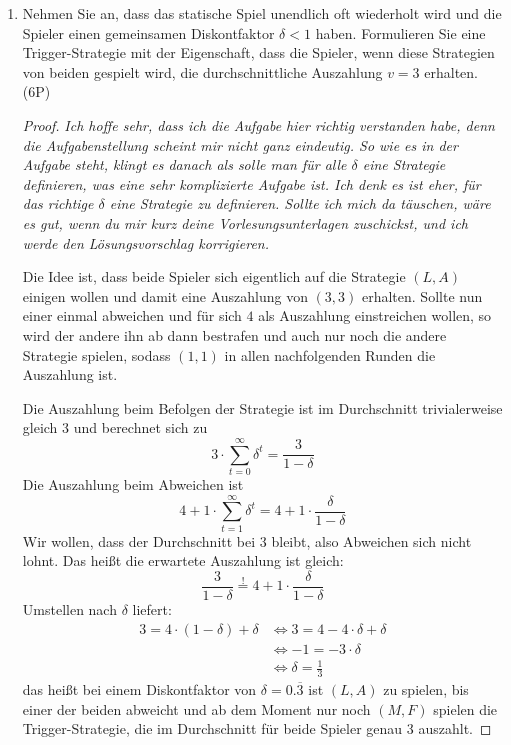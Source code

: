 \documentclass[12pt]{article}
\begin{document}
\begin{enumerate}[label=\alph*\upshape)]
\begin{proof}
			\textit{Bemerkung: Hier könntest du dir mal überlegen, wie viel Teilspiele ein dynamisches Spiel hätte. Solltest du Probleme haben, zeichne dir einen Spielbaum ein, aber vergiss die Informationsbezirke nicht}
		\end{proof}
	\item Nehmen Sie an, dass das statische Spiel unendlich oft wiederholt wird und die Spieler einen gemeinsamen Diskontfaktor $\delta < 1$ haben. Formulieren Sie eine Trigger-Strategie mit der Eigenschaft, dass die Spieler, wenn diese Strategien von beiden gespielt wird, die durchschnittliche Auszahlung $v = 3$ erhalten. (6P) 
		\begin{proof}
			\textit{Ich hoffe sehr, dass ich die Aufgabe hier richtig verstanden habe, denn die Aufgabenstellung scheint mir nicht ganz eindeutig. So wie es in der Aufgabe steht, klingt es danach als solle man für alle $\delta$ eine Strategie definieren, was eine sehr komplizierte Aufgabe ist. Ich denk es ist eher, für das richtige $\delta$ eine Strategie zu definieren. Sollte ich mich da täuschen, wäre es gut, wenn du mir kurz deine Vorlesungsunterlagen zuschickst, und ich werde den Lösungsvorschlag korrigieren.} ~\smallskip
			
			 Die Idee ist, dass beide Spieler sich eigentlich auf die Strategie $(L, A)$ einigen wollen und damit eine Auszahlung von $(3, 3)$ erhalten. Sollte nun einer einmal abweichen und für sich $4$ als Auszahlung einstreichen wollen, so wird der andere ihn ab dann bestrafen und auch nur noch die andere Strategie spielen, sodass $(1, 1)$ in allen nachfolgenden Runden die Auszahlung ist. ~\smallskip
			
			Die Auszahlung beim Befolgen der Strategie ist im Durchschnitt trivialerweise gleich 3 und berechnet sich zu
			$$ 3 \cdot \sum_{t = 0}^\infty \delta^t = \frac{3}{1 - \delta} $$
			Die Auszahlung beim Abweichen ist
			$$ 4 + 1 \cdot \sum_{t = 1}^\infty \delta^t = 4 + 1 \cdot \frac{\delta}{1 - \delta} $$
			Wir wollen, dass der Durchschnitt bei 3 bleibt, also Abweichen sich nicht lohnt. Das heißt die erwartete Auszahlung ist gleich:
			$$ \frac{3}{1 - \delta} \overset{!}{=} 4 + 1 \cdot \frac{\delta}{1 - \delta} $$
			Umstellen nach $\delta$ liefert:
			\begin{align*}
				3 = 4 \cdot (1 - \delta) + \delta & \iff 3 = 4 - 4 \cdot \delta + \delta \\
				& \iff -1 = -3 \cdot \delta \\
				& \iff \delta = \frac{1}{3}
			\end{align*}
			das heißt bei einem Diskontfaktor von $\delta = 0.\overline{3}$ ist $(L, A)$ zu spielen, bis einer der beiden abweicht und ab dem Moment nur noch $(M, F)$ spielen die Trigger-Strategie, die im Durchschnitt für beide Spieler genau 3 auszahlt.
		\end{proof}
\end{enumerate}
\end{document}
